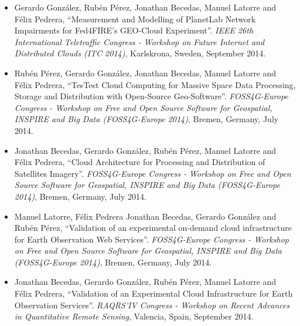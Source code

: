 \begin{itemize}
 
\item Gerardo González, Rubén Pérez, Jonathan Becedas, Manuel
  Latorre and Félix Pedrera, ``Measurement and Modelling of PlanetLab Network
  Impairments for Fed4FIRE’s GEO-Cloud Experiment''. \emph{IEEE 26th
    International Teletraffic Congress - Workshop on Future Internet and
    Distributed Clouds (ITC 2014)}, Karlskrona, Sweden, September 2014.

\item Rubén Pérez, Gerardo González, Jonathan Becedas, Manuel Latorre and
Félix Pedrera, ``TesTest Cloud Computing for Massive Space Data Processing,
Storage and Distribution with Open-Source Geo-Software''. \emph{FOSS4G-Europe Congress - Workshop on Free and Open Source Software
for Geospatial, INSPIRE and Big Data (FOSS4G-Europe 2014)},
Bremen, Germany, July 2014.

\item Jonathan Becedas, Gerardo González, Rubén Pérez, Manuel Latorre and Félix
Pedrera, ``Cloud Architecture for Processing and Distribution of Satellites
Imagery''. \emph{FOSS4G-Europe Congress - Workshop on Free and Open Source Software
for Geospatial, INSPIRE and Big Data (FOSS4G-Europe 2014)},
Bremen, Germany, July 2014.
\item Manuel Latorre, Félix Pedrera Jonathan Becedas, Gerardo González and Rubén
  Pérez, ``Validation of an experimental on-demand cloud infrastructure for Earth
  Observation Web Services''. \emph{FOSS4G-Europe Congress - Workshop on Free and Open
  Source Software for Geospatial, INSPIRE and Big Data (FOSS4G-Europe 2014)},
Bremen, Germany, July 2014.
\item Jonathan Becedas, Gerardo González, Rubén Pérez, Manuel Latorre and Félix
Pedrera, ``Validation of an Experimental Cloud Infrastructure for Earth
Observation Services''. \emph{RAQRS'IV Congress - Workshop on Recent Advances in
Quantitative Remote Sensing}, Valencia, Spain, September 2014.

\end{itemize}
